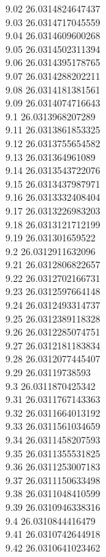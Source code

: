 {9.02	26.0314824647437\\
9.03	26.0314717045559\\
9.04	26.0314609600268\\
9.05	26.0314502311394\\
9.06	26.0314395178765\\
9.07	26.0314288202211\\
9.08	26.0314181381561\\
9.09	26.0314074716643\\
9.1	26.0313968207289\\
9.11	26.0313861853325\\
9.12	26.0313755654582\\
9.13	26.031364961089\\
9.14	26.0313543722076\\
9.15	26.0313437987971\\
9.16	26.0313332408404\\
9.17	26.0313226983203\\
9.18	26.0313121712199\\
9.19	26.031301659522\\
9.2	26.0312911632096\\
9.21	26.0312806822657\\
9.22	26.0312702166731\\
9.23	26.0312597664148\\
9.24	26.0312493314737\\
9.25	26.0312389118328\\
9.26	26.0312285074751\\
9.27	26.0312181183834\\
9.28	26.0312077445407\\
9.29	26.03119738593\\
9.3	26.0311870425342\\
9.31	26.0311767143363\\
9.32	26.0311664013192\\
9.33	26.0311561034659\\
9.34	26.0311458207593\\
9.35	26.0311355531825\\
9.36	26.0311253007183\\
9.37	26.0311150633498\\
9.38	26.0311048410599\\
9.39	26.0310946338316\\
9.4	26.0310844416479\\
9.41	26.0310742644918\\
9.42	26.0310641023462\\
}
